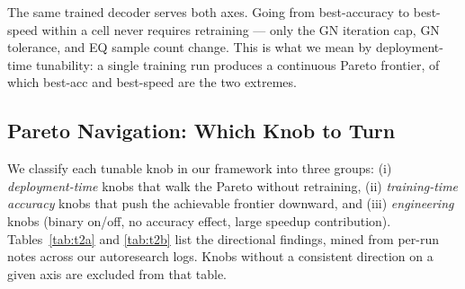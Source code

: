 \documentclass{article}
\begin{document}
  The same trained decoder serves both axes. Going from best-accuracy to                                   
  best-speed within a cell never requires retraining --- only the GN
  iteration cap, GN tolerance, and EQ sample count change. This is what                                    
  we mean by deployment-time tunability: a single training run produces                                    
  a continuous Pareto frontier, of which best-acc and best-speed are                                       
  the two extremes.                                                                                        
                                                                                                           
  \subsection{Pareto Navigation: Which Knob to Turn}                                                       
  \label{sec:results:tunability}                      
                                                                                                           
  We classify each tunable knob in our framework into three groups: (i)                                    
  \emph{deployment-time} knobs that walk the Pareto without retraining,
  (ii) \emph{training-time accuracy} knobs that push the achievable                                        
  frontier downward, and (iii) \emph{engineering} knobs (binary on/off,                                    
  no accuracy effect, large speedup contribution). Tables~\ref{tab:t2a}                                    
  and \ref{tab:t2b} list the directional findings, mined from per-run                                      
  notes across our autoresearch logs. Knobs without a consistent                                           
  direction on a given axis are excluded from that table.                                                  
                                                                                                           
\end{document}

